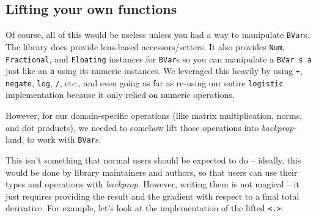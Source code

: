\documentclass[]{article}
\newenvironment{Shaded}{}{}
\newcommand{\DataTypeTok}[1]{\textcolor[rgb]{0.56,0.13,0.00}{#1}}
\newcommand{\DecValTok}[1]{\textcolor[rgb]{0.25,0.63,0.44}{#1}}
\newcommand{\FunctionTok}[1]{\textcolor[rgb]{0.02,0.16,0.49}{#1}}
\newcommand{\KeywordTok}[1]{\textcolor[rgb]{0.00,0.44,0.13}{\textbf{#1}}}
\newcommand{\NormalTok}[1]{#1}
\newcommand{\OtherTok}[1]{\textcolor[rgb]{0.00,0.44,0.13}{#1}}
\begin{document}
\hypertarget{lifting-your-own-functions}{%
\subsection{Lifting your own functions}\label{lifting-your-own-functions}}

Of course, all of this would be useless unless you had a way to manipulate
\texttt{BVar}s. The library does provide lens-based accessors/setters. It also
provides \texttt{Num}, \texttt{Fractional}, and \texttt{Floating} instances for
\texttt{BVar}s so you can manipulate a \texttt{BVar\ s\ a} just like an
\texttt{a} using its numeric instances. We leveraged this heavily by using
\texttt{+}, \texttt{negate}, \texttt{log}, \texttt{/}, etc., and even going as
far as re-using our entire \texttt{logistic} implementation because it only
relied on numeric operations.

However, for our domain-specific operations (like matrix multiplication, norms,
and dot products), we needed to somehow lift those operations into
\emph{backprop}-land, to work with \texttt{BVar}s.

This isn't something that normal users should be expected to do -- ideally, this
would be done by library maintainers and authors, so that users can use their
types and operations with \emph{backprop}. However, writing them is not magical
-- it just requires providing the result and the gradient with respect to a
final total derivative. For example, let's look at the implementation of the
lifted \texttt{\textless{}.\textgreater{}}:

\begin{Shaded}
\end{Shaded}
\end{document}
